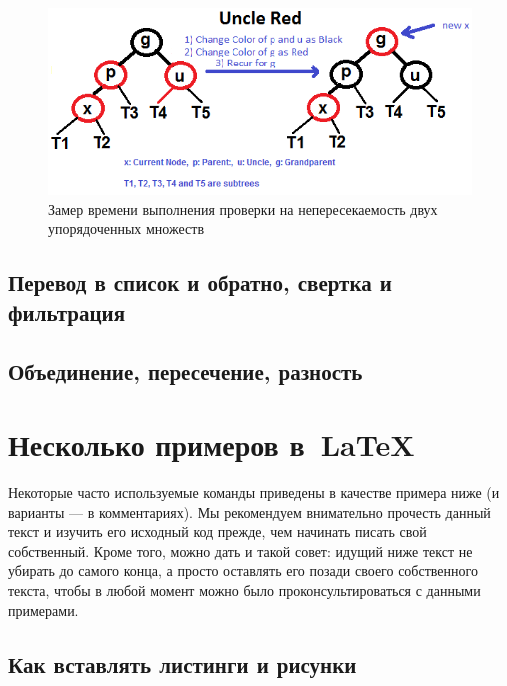 		
		\begin{figure}[H]
				\centering
				\includegraphics[width=\textwidth]{img/tan-aus.png}
				\caption{Замер времени выполнения проверки на непересекаемость двух упорядоченных множеств}
		\end{figure}
		
		
	
	\subsection{Перевод в список и обратно, свертка и фильтрация}
	\subsection{Объединение, пересечение, разность}




\section{Несколько примеров в~\LaTeX{}}
\label{sec:examples}

Некоторые часто используемые
команды приведены в качестве примера ниже (и варианты — в
комментариях). Мы рекомендуем внимательно прочесть данный
текст и изучить его исходный код прежде, чем начинать писать
свой собственный. Кроме того, можно дать и такой совет: идущий
ниже текст не убирать до самого конца, а просто оставлять его
позади своего собственного текста, чтобы в любой момент можно
было проконсультироваться с данными примерами.

\subsection{Как вставлять листинги и рисунки}


